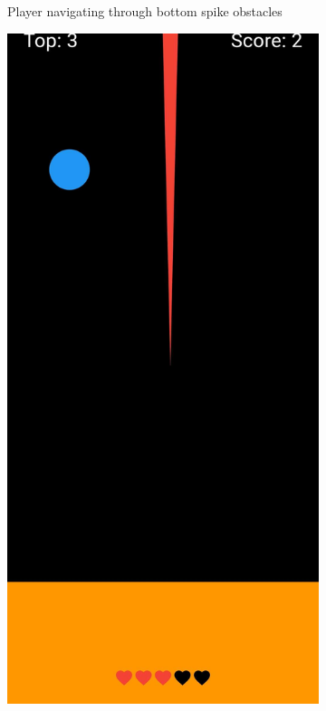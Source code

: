 \documentclass[runningheads]{llncs}
\begin{document}
\begin{figure}[h]
\begin{subfigure}{0.3\textwidth}
        \caption{Player navigating through bottom spike obstacles}
        \label{fig:gameplay1}
    \end{subfigure}
    \hfill
    \begin{subfigure}{0.3\textwidth}
        \centering
        \includegraphics[width=\linewidth]{figures/top_spike.jpg}

\end{subfigure}
\end{figure}
\end{document}
